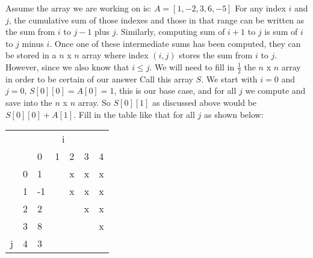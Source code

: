 \documentclass[12pt]{article}
\begin{document}
Assume the array we are working on is: $A = [1, -2, 3, 6, -5]$
For any index $i$ and $j$, the cumulative sum of those indexes and those in that range can be written as the sum from $i$ to $j-1$ plus $j$. Similarly, computing sum of $i+1$ to $j$ is sum of $i$ to $j$ minus $i$. Once one of these intermediate sums has been computed, they can be stored in a $n$ x $n$ array where index $(i,j)$ stores the sum from $i$ to $j$. However, since we also know that $i \leq j$. We will need to fill in $\frac{1}{2}$ the $n$ x $n$ array in order to be certain of our answer Call this array $S$. We start with $i=0$ and $j=0$, $S[0][0] = A[0] = 1$, this is our base case, and for all $j$ we compute and save into the $n$ x $n$ array. So $S[0][1]$ as discussed above would be $S[0][0] + A[1]$. Fill in the table like that for all $j$ as shown below:
\begin{center}
\begin{tabular}{lllllll}
                    & \multicolumn{6}{c}{i}                                                                                                                                                                   \\
                    &                        & 0  & 1                                                & 2                         & 3                         & 4                                              \\ \cline{3-7} 
                    & \multicolumn{1}{l|}{0} & 1  & \cellcolor[HTML]{FFCCC9}{\color[HTML]{000000} x} & \cellcolor[HTML]{FFCCC9}x & \cellcolor[HTML]{FFCCC9}x & \multicolumn{1}{l|}{\cellcolor[HTML]{FFCCC9}x} \\
                    & \multicolumn{1}{l|}{1} & -1 &                                                  & \cellcolor[HTML]{FFCCC9}x & \cellcolor[HTML]{FFCCC9}x & \multicolumn{1}{l|}{\cellcolor[HTML]{FFCCC9}x} \\
                    & \multicolumn{1}{l|}{2} & 2  &                                                  &                           & \cellcolor[HTML]{FFCCC9}x & \multicolumn{1}{l|}{\cellcolor[HTML]{FFCCC9}x} \\
                    & \multicolumn{1}{l|}{3} & 8  &                                                  &                           &                           & \multicolumn{1}{l|}{\cellcolor[HTML]{FFCCC9}x} \\
\multirow{-6}{*}{j} & \multicolumn{1}{l|}{4} & 3  &                                                  &                           &                           & \multicolumn{1}{l|}{}                          \\ \cline{3-7} 
\end{tabular}
\end{center}
\end{document}
